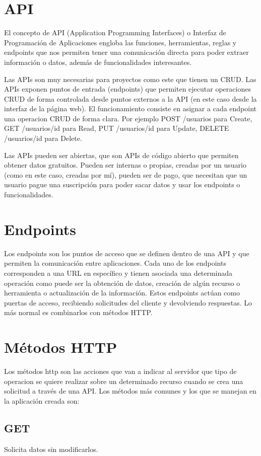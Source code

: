 \section{API}
El concepto de API (Application Programming Interfaces) o Interfaz de Programación de Aplicaciones engloba las funciones, herramientas, reglas y endpoints que nos permiten tener una comunicación directa para poder extraer información o datos, además de funcionalidades interesantes.

Las APIs son muy necesarias para proyectos como este que tienen un CRUD. Las APIs exponen puntos de entrada (endpoints) que permiten ejecutar operaciones CRUD de forma controlada desde puntos externos a la API (en este caso desde la interfaz de la página web). El funcionamiento consiste en asignar a cada endpoint una operacion CRUD de forma clara. Por ejemplo POST /usuarios para Create, GET /usuarios/{id} para Read, PUT /usuarios/{id} para Update, DELETE /usuarios/{id} para Delete.

Las APIs pueden ser abiertas, que son APIs de código abierto que permiten obtener datos gratuitos. Pueden ser internas o propias, creadas por un usuario (como en este caso, creadas por mí), pueden ser de pago, que necesitan que un usuario pague una suscripción para poder sacar datos y usar los endpoints o funcionalidades.


\section{Endpoints}
Los endpoints son los puntos de acceso que se definen dentro de una API y que permiten la comunicación entre aplicaciones. Cada uno de los endpoints corresponden a una URL en específico y tienen asociada una determinada operación como puede ser la obtención de datos, creación de algún recurso o herramienta o actualización de la información. Estos endpoints actúan como puertas de acceso, recibiendo solicitudes del cliente y devolviendo respuestas. Lo más normal es combinarlos con métodos HTTP.


\section{Métodos HTTP}
Los métodos http son las acciones que van a indicar al servidor que tipo de operacion se quiere realizar sobre un determinado recurso cuando se crea una solicitud a través de una API. Los métodos más comunes y los que se manejan en la aplicación creada son:
\subsection{GET}
Solicita datos sin modificarlos.

